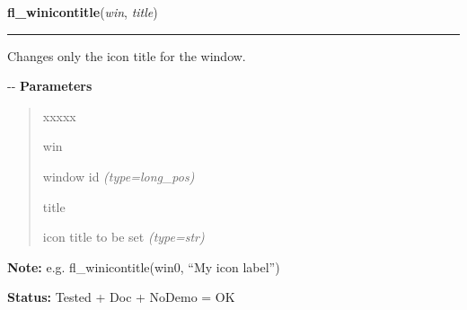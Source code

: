 \hspace{.8\funcindent}\begin{boxedminipage}{\funcwidth}

    \raggedright \textbf{fl\_winicontitle}(\textit{win}, \textit{title})

    \vspace{-1.5ex}

    \rule{\textwidth}{0.5\fboxrule}
\setlength{\parskip}{2ex}

Changes only the icon title for the window.

-{}-
\setlength{\parskip}{1ex}
      \textbf{Parameters}
      \vspace{-1ex}

      \begin{quote}
        \begin{Ventry}{xxxxx}

          \item[win]


window id
            {\it (type=long\_pos)}

          \item[title]


icon title to be set
            {\it (type=str)}

        \end{Ventry}

      \end{quote}

\textbf{Note:} 
e.g. fl\_winicontitle(win0, ``My icon label'')


\textbf{Status:} 
Tested + Doc + NoDemo = OK


    \end{boxedminipage}

    \label{xformslib:flxbasic:fl_winposition}

    \vspace{0.5ex}

